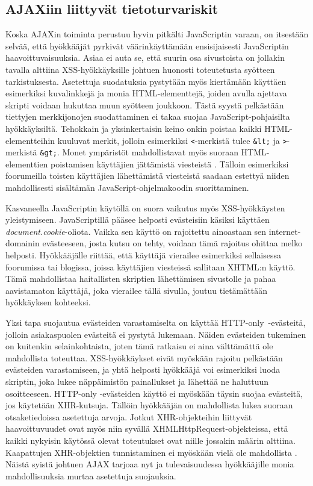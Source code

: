 \subsection{AJAXiin liittyvät tietoturvariskit}

Koska AJAXin toiminta perustuu hyvin pitkälti JavaScriptin varaan, on itsestään selvää, että hyökkääjät pyrkivät väärinkäyttämään ensisijaisesti JavaScriptin haavoittuvaisuuksia.  
Asiaa ei auta se, että suurin osa sivustoista on jollakin tavalla alttiina XSS-hyökkäyksille \cite{WEB2c} johtuen huonosti toteutetusta syötteen tarkistuksesta. Asetettuja suodatuksia 
pystytään myös kiertämään käyttäen esimerkiksi kuvalinkkejä ja monia HTML-elementtejä, joiden avulla ajettava skripti voidaan hukuttaa muun syötteen joukkoon. Tästä syystä pelkästään 
tiettyjen merkkijonojen suodattaminen ei takaa suojaa JavaScript-pohjaisilta hyökkäyksiltä. Tehokkain ja yksinkertaisin keino onkin poistaa kaikki HTML-elementteihin kuuluvat merkit, 
jolloin esimerkiksi \texttt{<}-merkistä tulee \texttt{\&lt;} ja \texttt{>}-merkistä \texttt{\&gt;}. Monet ympäristöt mahdollistavat myös suoraan HTML-elementtien poistamisen käyttäjien
jättämistä viesteistä \cite{AJAX}. Tälloin esimerkiksi foorumeilla toisten käyttäjien lähettämistä viesteistä saadaan estettyä niiden mahdollisesti sisältämän JavaScript-ohjelmakoodin
suorittaminen.

Kasvaneella JavaScriptin käytöllä on suora vaikutus myös XSS-hyökkäysten yleistymiseen. JavaScriptillä pääsee helposti evästeisiin käsiksi käyttäen \emph{document.cookie}-oliota. 
Vaikka sen käyttö on rajoitettu ainoastaan sen internet-domainin evästeeseen, josta kutsu on tehty, voidaan tämä rajoitus ohittaa melko helposti. Hyökkääjälle riittää, että käyttäjä 
vierailee esimerkiksi sellaisessa foorumissa tai blogissa, joissa käyttäjien viesteissä sallitaan XHTML:n käyttö. Tämä mahdollistaa haitallisten skriptien lähettämisen sivustolle ja pahaa
aavistamaton käyttäjä, joka vierailee tällä sivulla, joutuu tietämättään hyökkäyksen kohteeksi.

Yksi tapa suojautua evästeiden varastamiselta on käyttää HTTP-only~-evästeitä, jolloin asiakaspuolen evästeitä ei pystytä lukemaan. Näiden evästeiden tukeminen on kuitenkin selainkohtaista,
joten tämä ratkaisu ei aina välttämättä ole mahdollista toteuttaa. XSS-hyökkäykset eivät myöskään rajoitu pelkästään evästeiden varastamiseen, ja yhtä helposti hyökkääjä voi esimerkiksi
luoda skriptin, joka lukee näppäimistön painallukset ja lähettää ne haluttuun osoitteeseen. HTTP-only -evästeiden käyttö ei myöskään täysin suojaa evästeitä, jos käytetään XHR-kutsuja. 
Tällöin hyökkääjän on mahdollista lukea suoraan otsaketiedoissa asetettuja arvoja. Jotkut XHR-objekteihin liittyvät haavoittuvuudet ovat myös niin syvällä XHMLHttpRequest-objekteissa, että 
kaikki nykyisin käytössä olevat toteutukset ovat niille jossakin määrin alttiina. Kaapattujen XHR-objektien tunnistaminen ei myöskään vielä ole mahdollista \cite{AJAX}. Näistä syistä johtuen 
AJAX tarjoaa nyt ja tulevaisuudessa hyökkääjille monia mahdollisuuksia murtaa asetettuja suojauksia.

